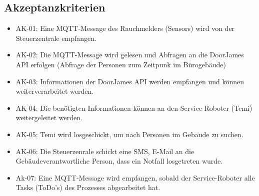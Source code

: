 \subsection*{Akzeptanzkriterien}
\begin{itemize}
    \item AK-01: Eine MQTT-Message des Rauchmelders (Sensors) wird von der Steuerzentrale empfangen.
    \item AK-02: Die MQTT-Message wird gelesen und Abfragen an die DoorJames API erfolgen (Abfrage der Personen zum Zeitpunk im Bürogebäude)
    \item AK-03: Informationen der DoorJames API werden empfangen und können weiterverarbeitet werden. 
    \item AK-04: Die benötigten Informationen können an den Service-Roboter (Temi) weitergeleitet werden.
    \item AK-05: Temi wird losgeschickt, um nach Personen im Gebäude zu suchen.
    \item AK-06: Die Steuerzenrale schickt eine SMS, E-Mail an die Gebäudeverantwortliche Person, dass ein Notfall losgetreten wurde.
    \item Ak-07: Eine MQTT-Message wird empfangen, sobald der Service-Roboter alle Tasks (ToDo's)  des Prozesses abgearbeitet hat. 
\end{itemize}